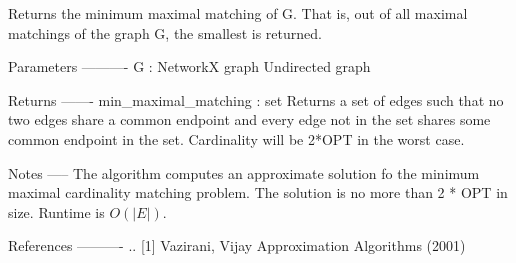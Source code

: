 \begin{DoxyVerb}Returns the minimum maximal matching of G. That is, out of all maximal
matchings of the graph G, the smallest is returned.

Parameters
----------
G : NetworkX graph
  Undirected graph

Returns
-------
min_maximal_matching : set
  Returns a set of edges such that no two edges share a common endpoint
  and every edge not in the set shares some common endpoint in the set.
  Cardinality will be 2*OPT in the worst case.

Notes
-----
The algorithm computes an approximate solution fo the minimum maximal
cardinality matching problem. The solution is no more than 2 * OPT in size.
Runtime is $O(|E|)$.

References
----------
.. [1] Vazirani, Vijay Approximation Algorithms (2001)
\end{DoxyVerb}
 